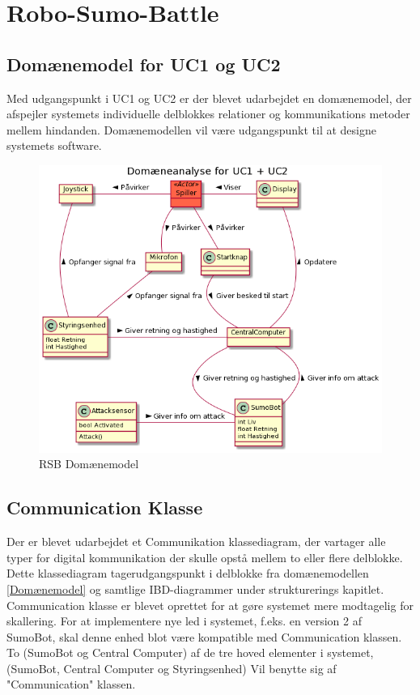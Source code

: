 \section{Robo-Sumo-Battle}\label{sec:RBS_design}


\subsection{Domænemodel for UC1 og UC2}

Med udgangspunkt i UC1 og UC2 er der blevet udarbejdet en domænemodel, der afspejler systemets individuelle delblokkes relationer og kommunikations metoder mellem hindanden. Domænemodellen vil være udgangspunkt til at designe systemets software. 

\begin{figure}
    \centering
    \includegraphics[width=\textwidth]{figs/Design/Central Computer/applikationsmodel/Domaenemodel.png}
    \caption{RSB Domænemodel}
    \label{fig:RSB_Domænemodel}
\end{figure}

\subsection{Communication Klasse}
Der er blevet udarbejdet et Communikation klassediagram, der vartager alle typer for digital kommunikation der skulle opstå mellem to eller flere delblokke. Dette klassediagram tagerudgangspunkt i delblokke fra domænemodellen \ref{Domænemodel} og samtlige IBD-diagrammer under strukturerings kapitlet. Communication klasse er blevet oprettet for at gøre systemet mere modtagelig for skallering. For at implementere nye led i systemet, f.eks. en version 2 af SumoBot, skal denne enhed blot være kompatible med Communication klassen. To (SumoBot og Central Computer) af de tre hoved elementer i systemet, (SumoBot, Central Computer og Styringsenhed) Vil benytte sig af "Communication" klassen.

